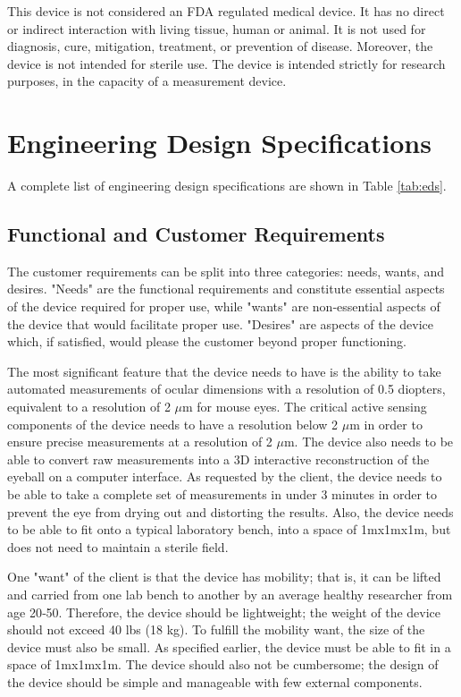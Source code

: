 \documentclass{article}
\begin{document}
This device is not considered an FDA regulated medical device. It has
no direct or indirect interaction with living tissue, human or
animal. It is not used for diagnosis, cure, mitigation, treatment, or
prevention of disease. Moreover, the device is not intended for
sterile use. The device is intended strictly for research
purposes, in the capacity of a measurement device.

\section{Engineering Design Specifications}
A complete list of engineering design specifications are shown in Table \ref{tab:eds}.

\subsection{Functional and Customer Requirements}
The customer requirements can be split into three categories: needs, wants, and desires. "Needs" are the functional requirements and constitute essential aspects of the device required for proper use, while "wants" are non‐essential aspects of the device that would facilitate proper use. "Desires" are aspects of the device which, if satisfied, would please the customer beyond proper functioning.  

The most significant feature that the device needs to have is the ability to take automated measurements of ocular dimensions with a resolution of 0.5 diopters, equivalent to a resolution of 2 $\mu$m for mouse eyes. The critical active sensing components of the device needs to have a resolution below 2 $\mu$m in order to ensure precise measurements at a resolution of 2 $\mu$m. The device also needs to be able to convert raw measurements into a 3D interactive reconstruction of the eyeball on a computer interface. As requested by the client, the device needs to be able to take a complete set of measurements in under 3 minutes in order to prevent the eye from drying out and distorting the results. Also, the device needs to be able to fit onto a typical laboratory bench, into a space of 1mx1mx1m, but does not need to maintain a sterile field.      

One "want" of the client is that the device has mobility; that is, it can be lifted and carried from one lab bench to another by an average healthy researcher from age 20‐50. Therefore, the device should be lightweight; the weight of the device should not exceed 40 lbs (18 kg)\cite{gross03}. To fulfill the mobility want, the size of the device must also be small. As specified earlier, the device must be able to fit in a space of 1mx1mx1m. The device should also not be cumbersome; the design of the device should be simple and manageable with few external components.
\end{document}
